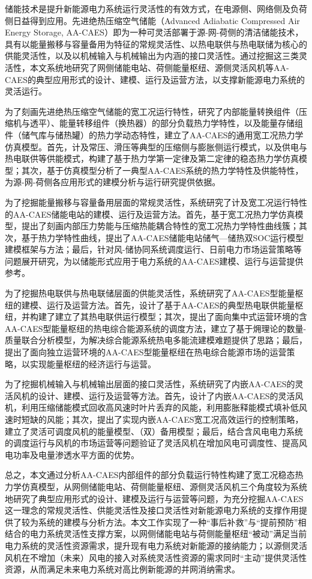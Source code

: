 \begin{cabstract}

储能技术是提升新能源电力系统运行灵活性的有效方式，在电源侧、网络侧及负荷侧日益得到应用。先进绝热压缩空气储能（Advanced Adiabatic Compressed Air Energy Storage, AA-CAES）即为一种可灵活部署于源-网-荷侧的清洁储能技术，具有以能量搬移与容量备用为特征的常规灵活性、以热电联供与热电联储为核心的供能灵活性，以及以机械输入与机械输出为内涵的接口灵活性。通过挖掘这三类灵活性，本文系统地研究了网侧储能电站、荷侧能量枢纽、源侧灵活风机等AA-CAES的典型应用形式的设计、建模、运行及运营方法，以支撑新能源电力系统的灵活运行。

为了刻画先进绝热压缩空气储能的宽工况运行特性，研究了内部能量转换组件（压缩机与透平）、能量转移组件（换热器）的部分负载热力学特性，以及能量存储组件（储气库与储热罐）的热力学动态特性，建立了AA-CAES的通用宽工况热力学仿真模型。首先，计及常压、滑压等典型的压缩侧与膨胀侧运行模式，以及供电与热电联供等供能模式，构建了基于热力学第一定律及第二定律的稳态热力学仿真模型；其次，基于仿真模型分析了一典型AA-CAES系统的热力学特性及供能特性，为源-网-荷侧各应用形式的建模分析与运行研究提供依据。

为了挖掘能量搬移与容量备用层面的常规灵活性，系统研究了计及宽工况运行特性的AA-CAES储能电站的建模、运行及运营方法。首先，基于宽工况热力学仿真模型，提出了刻画内部压力势能与压缩热能耦合特性的宽工况热力学特性曲线簇；其次，基于热力学特性曲线，提出了AA-CAES储能电站储气—储热双SOC运行模型建模框架与方法；最后，针对风-储协同系统调度运行、日前电力市场运营策略等问题展开研究，为以储能形式应用于电力系统的AA-CAES建模、运行与运营提供参考。

为了挖掘热电联供与热电联储层面的供能灵活性，系统研究了AA-CAES型能量枢纽的建模、运行及运营方法。首先，设计了基于AA-CAES的典型热电联供能量枢纽，并构建了建立了其热电联供运行模型；其次，提出了面向集中式运营环境的含AA-CAES型能量枢纽的热电综合能源系统的调度方法，建立了基于㶲理论的数量-质量联合分析模型，为解决综合能源系统热电多能流建模难题提供了思路；最后，提出了面向独立运营环境的AA-CAES型能量枢纽在热电综合能源市场的运营策略，以实现能量枢纽的经济运行与运营。

为了挖掘机械输入与机械输出层面的接口灵活性，系统研究了内嵌AA-CAES的灵活风机的设计、建模、运行及运营等方法。首先，设计了内嵌AA-CAES的灵活风机，利用压缩储能模式回收高风速时叶片丢弃的风能，利用膨胀释能模式填补低风速时短缺的风能；其次，提出了实现内嵌AA-CAES宽工况高效运行的控制策略，建立了灵活可调度风机的能量模型、（双）备用模型；最后，结合含风电电力系统的调度运行与风机的市场运营等问题验证了灵活风机在增加风电可调度性、提高风电功率及电量渗透水平方面的优势。

总之，本文通过分析AA-CAES内部组件的部分负载运行特性构建了宽工况稳态热力学仿真模型，从网侧储能电站、荷侧能量枢纽、源侧灵活风机三个角度较为系统地研究了典型应用形式的设计、建模及运行与运营等问题，为充分挖掘AA-CAES这一理念的常规灵活性、供能灵活性及接口灵活性对新能源电力系统的支撑作用提供了较为系统的建模与分析方法。本文工作实现了一种“事后补救”与“提前预防”相结合的电力系统灵活性支撑方案，以网侧储能电站与荷侧能量枢纽“被动”满足当前电力系统的灵活性资源需求，提升现有电力系统对新能源的接纳能力；以源侧灵活风机在不增加（未来）风电的接入对系统灵活性资源的需求同时“主动”提供灵活性资源，从而满足未来电力系统对高比例新能源的并网消纳需求。
\end{cabstract}

